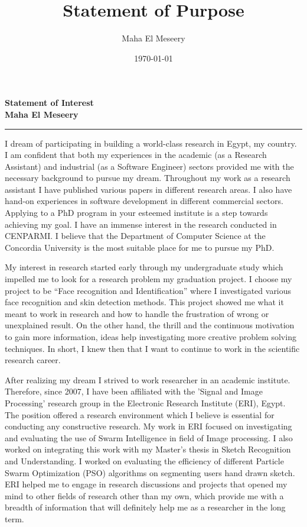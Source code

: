 \documentclass[10pt]{article}%
\title{Statement of Purpose}
\author{Maha El Meseery }
\date{\today}
\begin{document}
\large
 \begin{center}
\textbf{ Statement of  Interest \\ Maha El Meseery } \hrule
\end{center}
\normalsize

  I dream of participating in building a world-class research in Egypt, my country. I am confident that both my experiences in the academic (as a Research Assistant) and industrial (as a Software Engineer) sectors provided me with the necessary background to pursue my dream. Throughout my work as a research assistant I have published various papers in different research areas. I also have hand-on experiences in software development in different commercial sectors. Applying to a PhD program in your esteemed institute is a step towards achieving my goal. I have an immense interest in the research conducted in CENPARMI. I believe that the Department of Computer Science at the Concordia University is the most suitable place for me to pursue my PhD.

 My interest in research started early through my undergraduate study which impelled me to look for a research problem my graduation project. I choose my project to be ``Face recognition and Identification'' where I investigated various face recognition and skin detection methods. This project showed me what it meant to work in research and how to handle the frustration of wrong or unexplained result. On the other hand, the thrill and the continuous motivation to gain more information, ideas help investigating more creative problem solving techniques. In short, I knew then that I want to continue to work in the scientific research career.


 After realizing my dream I strived to work researcher in an academic institute. Therefore, since 2007, I have been affiliated with the 'Signal and Image Processing' research group in the Electronic Research Institute (ERI), Egypt. The position offered a research environment which I believe is essential for conducting any constructive research. My work in ERI focused on investigating and evaluating the use of Swarm Intelligence in field of Image processing. I also worked on integrating this work with my Master's thesis in Sketch Recognition and Understanding. I worked on evaluating the efficiency of different Particle Swarm Optimization (PSO) algorithms on segmenting users hand drawn sketch. ERI helped me to engage in research discussions and projects that opened my mind to other fields of research other than my own, which provide me with a breadth of information that will definitely help me as a researcher in the long term.
\end{document}
